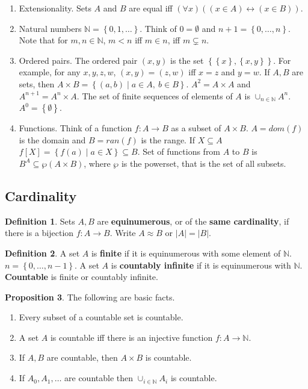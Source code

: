 \documentclass{article}
\newcommand{\N}{\mathbb{N}}
\newcommand{\rb}[1]{\left( #1 \right)}
\renewcommand{\sb}[1]{\left[ #1 \right]}
\newcommand{\cb}[1]{\left\{ #1 \right\}}
\newcommand{\abs}[1]{\left\lvert #1 \right\rvert}
\newcommand{\iffb}[2]{\rb{#1 \leftrightarrow #2}}
\newcommand{\fab}[1]{\rb{\forall #1}}
\newcommand{\inb}[2]{\rb{#1 \in #2}}
\theoremstyle{definition}\newtheorem{definition}{Definition}[subsection]
\theoremstyle{definition}\newtheorem{remark}[definition]{Remark}
\theoremstyle{definition}\newtheorem*{example}{Example}
\theoremstyle{definition}\newtheorem*{note}{Note}
\newtheorem{proposition}[definition]{Proposition}
\begin{document}
\begin{enumerate}
\addtocounter{enumi}{-1}
\item Extensionality. Sets $ A $ and $ B $ are equal iff $ \fab{x}\iffb{\inb{x}{A}}{\inb{x}{B}} $.
\item Natural numbers $ \N = \cb{0, 1, \dots} $. Think of $ 0 = \emptyset $ and $ n + 1 = \cb{0, \dots, n} $. Note that for $ m, n \in \N $, $ m < n $ iff $ m \in n $, iff $ m \subsetneq n $.
\item Ordered pairs. The ordered pair $ \rb{x, y} $ is the set $ \cb{\cb{x}, \cb{x, y}} $. For example, for any $ x, y, z, w $, $ \rb{x, y} = \rb{z, w} $ iff $ x = z $ and $ y = w $. If $ A, B $ are sets, then $ A \times B = \cb{\rb{a, b} \mid a \in A, \ b \in B} $. $ A^2 = A \times A $ and $ A^{n + 1} = A^n \times A $. The set of finite sequences of elements of $ A $ is $ \cup_{n \in \N} A^n $. $ A^0 = \cb{\emptyset} $.
\item Functions. Think of a function $ f : A \to B $ as a subset of $ A \times B $. $ A = dom\rb{f} $ is the domain and $ B = ran\rb{f} $ is the range. If $ X \subseteq A $ $ f\sb{X} = \cb{f\rb{a} \mid a \in X} \subseteq B $. Set of functions from $ A $ to $ B $ is $ B^A \subseteq \wp\rb{A \times B} $, where $ \wp $ is the powerset, that is the set of all subsets.
\end{enumerate}

\subsection{Cardinality}

\begin{definition}
Sets $ A, B $ are \textbf{equinumerous}, or of the \textbf{same cardinality}, if there is a bijection $ f : A \to B $. Write $ A \approx B $ or $ \abs{A} = \abs{B} $.
\end{definition}

\begin{definition}
A set $ A $ is \textbf{finite} if it is equinumerous with some element of $ \N $. $ n = \cb{0, \dots, n - 1} $. A set $ A $ is \textbf{countably infinite} if it is equinumerous with $ \N $. \textbf{Countable} is finite or countably infinite.
\end{definition}

\begin{proposition}
The following are basic facts.
\begin{enumerate}
\item Every subset of a countable set is countable.
\item A set $ A $ is countable iff there is an injective function $ f : A \to \N $.
\item If $ A, B $ are countable, then $ A \times B $ is countable.
\item If $ A_0, A_1, \dots $ are countable then $ \cup_{i \in \N} A_i $ is countable.
\end{enumerate}
\end{proposition}
\end{document}
